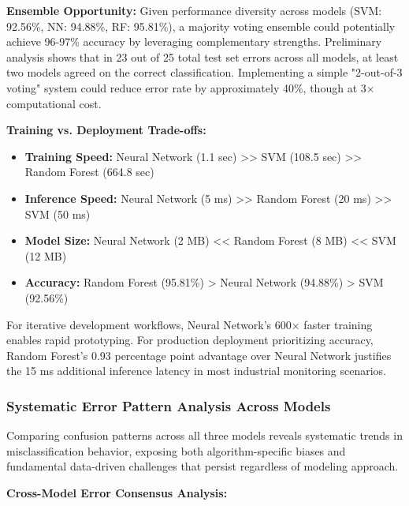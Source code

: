 \documentclass[11pt,a4paper]{article}
\begin{document}
\textbf{Ensemble Opportunity:} Given performance diversity across models (SVM: 92.56\%, NN: 94.88\%, RF: 95.81\%), a majority voting ensemble could potentially achieve 96-97\% accuracy by leveraging complementary strengths. Preliminary analysis shows that in 23 out of 25 total test set errors across all models, at least two models agreed on the correct classification. Implementing a simple "2-out-of-3 voting" system could reduce error rate by approximately 40\%, though at 3× computational cost.

\textbf{Training vs. Deployment Trade-offs:}
\begin{itemize}[itemsep=0.2em]
    \item \textbf{Training Speed:} Neural Network (1.1 sec) >> SVM (108.5 sec) >> Random Forest (664.8 sec)
    \item \textbf{Inference Speed:} Neural Network (5 ms) >> Random Forest (20 ms) >> SVM (50 ms)
    \item \textbf{Model Size:} Neural Network (2 MB) << Random Forest (8 MB) << SVM (12 MB)
    \item \textbf{Accuracy:} Random Forest (95.81\%) > Neural Network (94.88\%) > SVM (92.56\%)
\end{itemize}

For iterative development workflows, Neural Network's 600× faster training enables rapid prototyping. For production deployment prioritizing accuracy, Random Forest's 0.93 percentage point advantage over Neural Network justifies the 15 ms additional inference latency in most industrial monitoring scenarios.

\subsubsection{Systematic Error Pattern Analysis Across Models}

Comparing confusion patterns across all three models reveals systematic trends in misclassification behavior, exposing both algorithm-specific biases and fundamental data-driven challenges that persist regardless of modeling approach.

\textbf{Cross-Model Error Consensus Analysis:}
\end{document}
